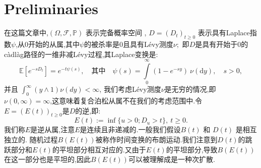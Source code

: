\documentclass[12pt,final]{article}
\theoremstyle{plain}
\theoremstyle{Definition}
\theoremstyle{Remark}
\begin{document}
	\section{Preliminaries}
	
	在这篇文章中,$(\Omega,\mathcal{F},\mathbb{P})$ 表示完备概率空间 , $D=(D_t)_{t\geq0}$ 表示具有Laplace指数$\psi$,从0开始的从属,其中$\psi$的被杀率是0且具有Lévy测度$\nu;$ 即$D$是具有开始于0的càdlàg路径的一维非减Lévy过程,其Laplace变换是:
	$$\mathbb{E}[e^{-sD_t}]=e^{-t\psi(s)},\quad\text{其中}\quad\psi(s)=\int\limits_0^\infty(1-e^{-sy})\:\nu(\text{d}y),\quad s>0,$$
	并且 $\int_0^\infty(y\wedge1)\nu(dy) < \infty$,
	我们考虑Lévy测度$\nu$是无穷的情况,即$\nu ( 0, \infty ) = \infty$,这意味着复合泊松从属不在我们的考虑范围中.令 $E=(E(t))_{t\geq0}$是$D$的逆,即:
	$$E(t):=\inf\{u>0;D_u>t\},\:t\geq0.$$
	我们称$E$是逆从属,注意$E$是连续且非递减的.一般我们假设$B(t)$ 和 $D(t)$ 是相互独立的. 随机过程$B(E(t))$被称作时间变换的布朗运动.我们注意到$D(t)$的跳跃部分和$E(t)$的平坦部分相互对应的.又由于$E(t)$的平坦部分,导致$B(E(t))$在这一部分也是平坦的,因此$B(E(t))$可以被理解成是一种次扩散.
	
\end{document}
